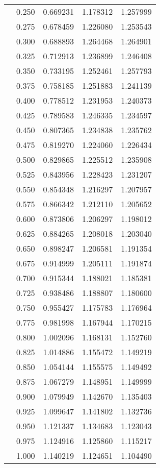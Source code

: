 \begin{tabular}{llrrr}
         & 0.250 &   0.669231 &   1.178312 &   1.257999 \\
         & 0.275 &   0.678459 &   1.226080 &   1.253543 \\
         & 0.300 &   0.688893 &   1.264468 &   1.264901 \\
         & 0.325 &   0.712913 &   1.236899 &   1.246408 \\
         & 0.350 &   0.733195 &   1.252461 &   1.257793 \\
         & 0.375 &   0.758185 &   1.251883 &   1.241139 \\
         & 0.400 &   0.778512 &   1.231953 &   1.240373 \\
         & 0.425 &   0.789583 &   1.246335 &   1.234597 \\
         & 0.450 &   0.807365 &   1.234838 &   1.235762 \\
         & 0.475 &   0.819270 &   1.224060 &   1.226434 \\
         & 0.500 &   0.829865 &   1.225512 &   1.235908 \\
         & 0.525 &   0.843956 &   1.228423 &   1.231207 \\
         & 0.550 &   0.854348 &   1.216297 &   1.207957 \\
         & 0.575 &   0.866342 &   1.212110 &   1.205652 \\
         & 0.600 &   0.873806 &   1.206297 &   1.198012 \\
         & 0.625 &   0.884265 &   1.208018 &   1.203040 \\
         & 0.650 &   0.898247 &   1.206581 &   1.191354 \\
         & 0.675 &   0.914999 &   1.205111 &   1.191874 \\
         & 0.700 &   0.915344 &   1.188021 &   1.185381 \\
         & 0.725 &   0.938486 &   1.188807 &   1.180600 \\
         & 0.750 &   0.955427 &   1.175783 &   1.176964 \\
         & 0.775 &   0.981998 &   1.167944 &   1.170215 \\
         & 0.800 &   1.002096 &   1.168131 &   1.152760 \\
         & 0.825 &   1.014886 &   1.155472 &   1.149219 \\
         & 0.850 &   1.054144 &   1.155575 &   1.149492 \\
         & 0.875 &   1.067279 &   1.148951 &   1.149999 \\
         & 0.900 &   1.079949 &   1.142670 &   1.135403 \\
         & 0.925 &   1.099647 &   1.141802 &   1.132736 \\
         & 0.950 &   1.121337 &   1.134683 &   1.123043 \\
         & 0.975 &   1.124916 &   1.125860 &   1.115217 \\
         & 1.000 &   1.140219 &   1.124651 &   1.104490 \\
\bottomrule
\end{tabular}
